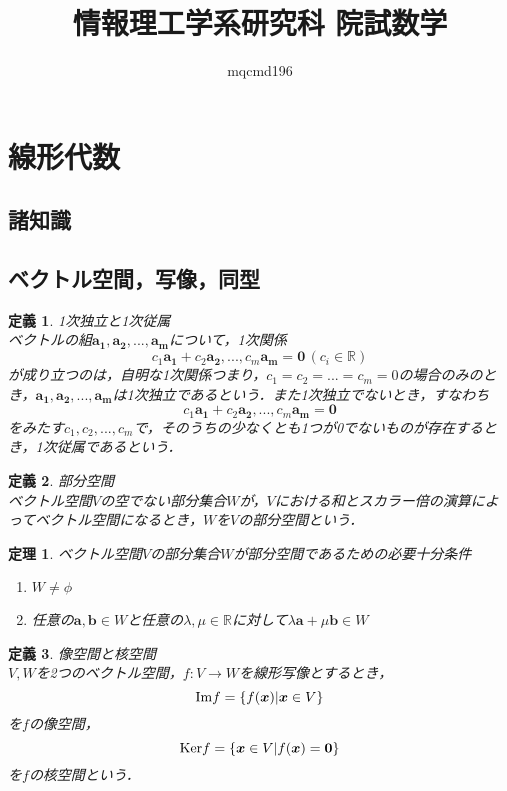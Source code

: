 \documentclass[uplatex]{jsarticle}
\title{情報理工学系研究科 院試数学}
\author{mqcmd196}
\newtheorem{definition}{定義}
\newtheorem{theorem}{定理}
\begin{document}
\section{線形代数}

\subsection{諸知識}

\subsection{ベクトル空間，写像，同型}
\begin{definition}
    \label{def:1次独立と1次従属}
    1次独立と1次従属\\
    ベクトルの組$\bm{a_1}, \bm{a_2}, ..., \bm{a_m}$について，1次関係$$c_1\bm{a_1} + c_2\bm{a_2}, ..., c_m\bm{a_m} = \bm{0} \, (c_i \in \mathbb{R})$$が成り立つのは，自明な1次関係つまり，$c_1 = c_2 = ... = c_m = 0$の場合のみのとき，$\bm{a_1}, \bm{a_2}, ..., \bm{a_m}$は1次独立であるという．また1次独立でないとき，すなわち$$c_1\bm{a_1} + c_2\bm{a_2}, ..., c_m\bm{a_m} = \bm{0}$$をみたす$c_1, c_2, ..., c_m$で，そのうちの少なくとも1つが0でないものが存在するとき，1次従属であるという．
\end{definition}

\begin{definition}
    部分空間\\
    ベクトル空間$V$の空でない部分集合$W$が，$V$における和とスカラー倍の演算によってベクトル空間になるとき，$W$を$V$の部分空間という．
\end{definition}

\begin{theorem}
    ベクトル空間$V$の部分集合$W$が部分空間であるための必要十分条件
    \begin{enumerate}
        \item $W \neq \phi$
        \item 任意の$\bm{a}, \bm{b} \in W$と任意の$\lambda, \mu \in \mathbb{R}$に対して$\lambda\bm{a} + \mu\bm{b} \in W$
    \end{enumerate}
\end{theorem}

\begin{definition}
    像空間と核空間\\
    $V, W$を2つのベクトル空間，$f:V \to W$を線形写像とするとき，$${\rm Im} f = \{f(\bm{x}) | \bm{x} \in V\}$$を$f$の像空間，$${\rm Ker} f = \{\bm{x} \in V | f(\bm{x}) = \bm{0}\}$$を$f$の核空間という．
\end{definition}
\end{document}
